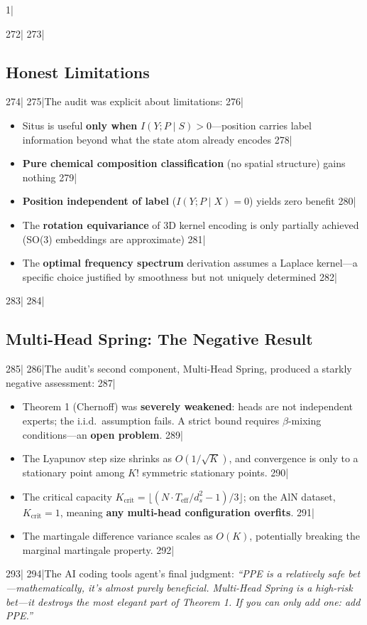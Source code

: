 1|\documentclass[12pt,a4paper]{article}
\begin{document}
272|
273|\subsection{Honest Limitations}
274|
275|The audit was explicit about limitations:
276|\begin{itemize}
277|\item Situs is useful \textbf{only when} $I(Y; P \mid S) > 0$—position carries label information beyond what the state atom already encodes
278|\item \textbf{Pure chemical composition classification} (no spatial structure) gains nothing
279|\item \textbf{Position independent of label} ($I(Y; P \mid X) = 0$) yields zero benefit
280|\item The \textbf{rotation equivariance} of 3D kernel encoding is only partially achieved (SO(3) embeddings are approximate)
281|\item The \textbf{optimal frequency spectrum} derivation assumes a Laplace kernel—a specific choice justified by smoothness but not uniquely determined
282|\end{itemize}
283|
284|\subsection{Multi-Head Spring: The Negative Result}
285|
286|The audit's second component, Multi-Head Spring, produced a starkly negative assessment:
287|\begin{itemize}
288|\item Theorem 1 (Chernoff) was \textbf{severely weakened}: heads are not independent experts; the i.i.d.\ assumption fails. A strict bound requires $\beta$-mixing conditions—an \textbf{open problem}.
289|\item The Lyapunov step size shrinks as $O(1/\sqrt{K})$, and convergence is only to a stationary point among $K!$ symmetric stationary points.
290|\item The critical capacity $K_{\text{crit}} = \lfloor(N \cdot T_{\text{eff}} / d_s^2 - 1)/3\rfloor$; on the AlN dataset, $K_{\text{crit}} = 1$, meaning \textbf{any multi-head configuration overfits}.
291|\item The martingale difference variance scales as $O(K)$, potentially breaking the marginal martingale property.
292|\end{itemize}
293|
294|The AI coding tools agent's final judgment: \textit{``PPE is a relatively safe bet—mathematically, it's almost purely beneficial. Multi-Head Spring is a high-risk bet—it destroys the most elegant part of Theorem 1. If you can only add one: add PPE.''}
\end{document}

